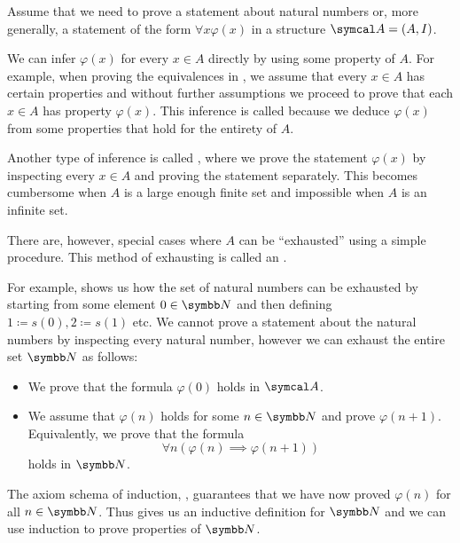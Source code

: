 \begin{remark}\label{remark:induction}
  Assume that we need to prove a statement about natural numbers or, more generally, a statement of the form \( \forall x \varphi(x) \) in a structure \( \Cal{A} = (A, I) \).

  We can infer \( \varphi(x) \) for every \( x \in A \) directly by using some property of \( A \). For example, when proving the equivalences in , we assume that every \( x \in A \) has certain properties and without further assumptions we proceed to prove that each \( x \in A \) has property \( \varphi(x) \). This inference is called  because we deduce \( \varphi(x) \) from some properties that hold for the entirety of \( A \).

  Another type of inference is called , where we prove the statement \( \varphi(x) \) by inspecting every \( x \in A \) and proving the statement separately. This becomes cumbersome when \( A \) is a large enough finite set and impossible when \( A \) is an infinite set.

  There are, however, special cases where \( A \) can be \enquote{exhausted} using a simple procedure. This method of exhausting is called an .

  For example,  shows us how the set of natural numbers can be exhausted by starting from some element \( 0 \in \BN \) and then defining \( 1 \coloneqq s(0), 2 \coloneqq s(1) \) etc. We cannot prove a statement about the natural numbers by inspecting every natural number, however we can exhaust the entire set \( \BN \) as follows:
  \begin{itemize}
    \item We prove that the formula \( \varphi(0) \) holds in \( \Cal{A} \).
    \item We assume that \( \varphi(n) \) holds for some \( n \in \BN \) and prove \( \varphi(n + 1) \). Equivalently, we prove that the formula
    \begin{equation*}
      \forall n (\varphi(n) \implies \varphi(n + 1))
    \end{equation*}
    holds in \( \BN \).
  \end{itemize}

  The axiom schema of induction, , guarantees that we have now proved \( \varphi(n) \) for all \( n \in \BN \). Thus  gives us an inductive definition for \( \BN \) and we can use induction to prove properties of \( \BN \).


\end{remark}
